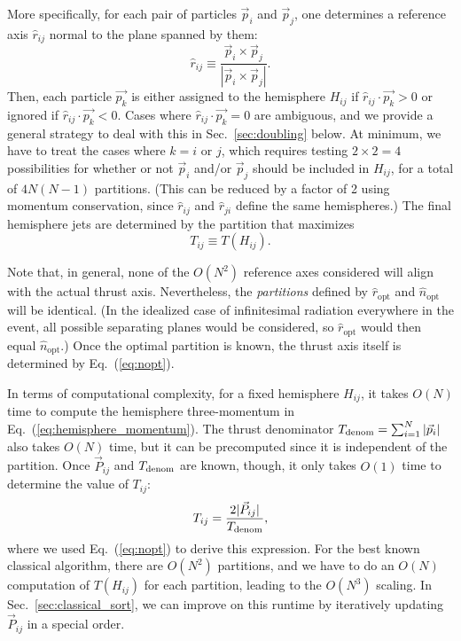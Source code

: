 \documentclass[aps,prd,twocolumn,superscriptaddress,preprintnumbers,nofootinbib,longbibliography,floatfix]{revtex4-1}
\DeclareRobustCommand{\Sec}[1]{Sec.~\ref{#1}}
\DeclareRobustCommand{\Eq}[1]{Eq.~(\ref{#1})}
\newcommand{\opt}{\text{opt}}
\begin{document}
More specifically, for each pair of particles $\vec{p}_i$ and $\vec{p}_j$, one determines a reference axis $\hat{r}_{ij}$ normal to the plane spanned by them:
%
\begin{equation}
\hat{r}_{ij} \equiv \frac{\vec{p}_i\times\vec{p}_j}{|\vec{p}_i\times\vec{p}_j|}.
\end{equation}
%
Then, each particle $\vec{p_k}$ is either assigned to the hemisphere $H_{ij}$ if $\hat{r}_{ij} \cdot \vec{p_k} >0$ or ignored if $\hat{r}_{ij} \cdot \vec{p_k} <0$.
%
Cases where $\hat{r}_{ij} \cdot \vec{p_k} = 0$ are ambiguous, and we provide a general strategy to deal with this in \Sec{sec:doubling} below.
%
At minimum, we have to treat the cases where $k = i$ or $j$, which requires testing $2 \times 2 = 4$ possibilities for whether or not $\vec{p}_i$ and/or $\vec{p}_j$ should be included in $H_{ij}$, for a total of $4 N (N -1)$ partitions.
%
(This can be reduced by a factor of 2 using momentum conservation, since $\hat{r}_{ij}$ and $\hat{r}_{ji}$ define the same hemispheres.)
%
The final hemisphere jets are determined by the partition that maximizes
%
\begin{equation}
T_{ij} \equiv T(H_{ij}).
\end{equation}


Note that, in general, none of the $O(N^2)$ reference axes considered will align with the actual thrust axis.
%
Nevertheless, the \emph{partitions} defined by $\hat{r}_{\opt}$ and $\hat{n}_{\opt}$ will be identical.
%
(In the idealized case of infinitesimal radiation everywhere in the event, all possible separating planes would be considered, so $\hat{r}_{\opt}$ would then equal $\hat{n}_{\opt}$.)
%
Once the optimal partition is known, the thrust axis itself is determined by \Eq{eq:nopt}.


In terms of computational complexity, for a fixed hemisphere $H_{ij}$, it takes $O(N)$ time to compute the hemisphere three-momentum in \Eq{eq:hemisphere_momentum}.
%
The thrust denominator $T_{\rm denom} = \sum_{i=1}^N|\vec{p}_i|$ also takes $O(N)$ time, but it can be precomputed since it is independent of the partition.
%
Once $\vec{P}_{ij}$ and $T_{\rm denom}$ are known, though, it only takes $O(1)$ time to determine the value of $T_{ij}$:
%
\begin{equation}
\label{eq:thrust_via_momentum}
T_{ij} = \frac{2 |\vec{P}_{ij}|}{T_{\rm denom}},
\end{equation}
%
where we used \Eq{eq:nopt} to derive this expression.
%
For the best known classical algorithm, there are $O(N^2)$ partitions, and we have to do an $O(N)$ computation of $T(H_{ij})$ for each partition, leading to the $O(N^3)$ scaling.
%
In \Sec{sec:classical_sort}, we can improve on this runtime by iteratively updating $\vec{P}_{ij}$ in a special order.
\end{document}
